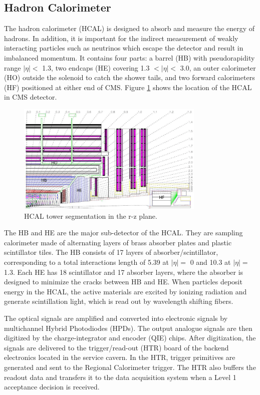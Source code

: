 \documentclass[thesis.tex]{subfiles}
\begin{document}
\subsection{Hadron Calorimeter}
The hadron calorimeter (HCAL) is designed to absorb and measure the energy of hadrons. 
In addition, it is important for the indirect measurement of weakly interacting particles such as neutrinos which escape the detector and result in imbalanced momentum.
It contains four parts: a barrel (HB) with pseudorapidity range $|\eta| < $ 1.3, two endcaps (HE) covering 1.3 $ < |\eta| <$ 3.0, an outer calorimeter (HO) outside the solenoid to catch the shower tails, and two forward calorimeters (HF) positioned at either end of CMS.
Figure \ref{fig:hcal} shows the location of the HCAL in CMS detector. 

\begin{figure}[hbt]
	\centering
	\includegraphics[width=0.8\textwidth]{plot/hcal.png}
	\caption{HCAL tower segmentation in the r-z plane.}
	\label{fig:hcal}
\end{figure}

The HB and HE are the major sub-detector of the HCAL. 
They are sampling calorimeter made of alternating layers of brass absorber plates and plastic scintillator tiles.
The HB consists of 17 layers of absorber/scintillator, corresponding to a total interactions length of 5.39 at $|\eta| =$ 0 and 10.3 at $|\eta| =$ 1.3.
Each HE has 18 scintillator and 17 absorber layers, where the absorber is designed to minimize the cracks between HB and HE. 
When particles deposit energy in the HCAL, the active materials are excited by ionizing radiation and generate scintillation light, which is read out by wavelength shifting fibers. 

The optical signals are amplified and converted into electronic signals by multichannel Hybrid Photodiodes (HPDs). 
The output analogue signals are then digitized by the charge-integrator and encoder (QIE) chips. 
After digitization, the signals are delivered to the trigger/read-out (HTR) board of the backend electronics located in the service cavern. 
In the HTR, trigger primitives are generated and sent to the Regional Calorimeter trigger.
The HTR also buffers the readout data and transfers it to the data acquisition system when a Level 1 acceptance decision is received.  
\end{document}
